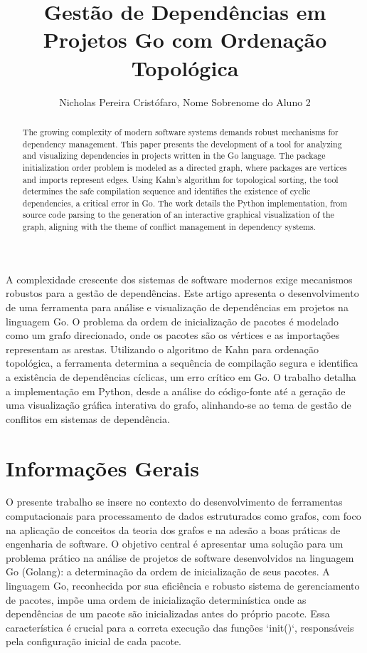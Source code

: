 \documentclass[12pt]{article}
\title{Gestão de Dependências em Projetos Go com Ordenação Topológica}
\author{Nicholas Pereira Cristófaro\inst{1}, Nome Sobrenome do Aluno 2\inst{1}}
\begin{document}
 

\maketitle

\begin{resumo} 
  A complexidade crescente dos sistemas de software modernos exige mecanismos robustos para a gestão de dependências. Este artigo apresenta o desenvolvimento de uma ferramenta para análise e visualização de dependências em projetos na linguagem Go. O problema da ordem de inicialização de pacotes é modelado como um grafo direcionado, onde os pacotes são os vértices e as importações representam as arestas. Utilizando o algoritmo de Kahn para ordenação topológica, a ferramenta determina a sequência de compilação segura e identifica a existência de dependências cíclicas, um erro crítico em Go. O trabalho detalha a implementação em Python, desde a análise do código-fonte até a geração de uma visualização gráfica interativa do grafo, alinhando-se ao tema de gestão de conflitos em sistemas de dependência.
\end{resumo}

\begin{abstract}
  The growing complexity of modern software systems demands robust mechanisms for dependency management. This paper presents the development of a tool for analyzing and visualizing dependencies in projects written in the Go language. The package initialization order problem is modeled as a directed graph, where packages are vertices and imports represent edges. Using Kahn's algorithm for topological sorting, the tool determines the safe compilation sequence and identifies the existence of cyclic dependencies, a critical error in Go. The work details the Python implementation, from source code parsing to the generation of an interactive graphical visualization of the graph, aligning with the theme of conflict management in dependency systems.
\end{abstract}

\section{Informações Gerais}

O presente trabalho se insere no contexto do desenvolvimento de ferramentas computacionais para processamento de dados estruturados como grafos, com foco na aplicação de conceitos da teoria dos grafos e na adesão a boas práticas de engenharia de software. O objetivo central é apresentar uma solução para um problema prático na análise de projetos de software desenvolvidos na linguagem Go (Golang): a determinação da ordem de inicialização de seus pacotes. A linguagem Go, reconhecida por sua eficiência e robusto sistema de gerenciamento de pacotes, impõe uma ordem de inicialização determinística onde as dependências de um pacote são inicializadas antes do próprio pacote. Essa característica é crucial para a correta execução das funções `init()`, responsáveis pela configuração inicial de cada pacote.
\end{document}
